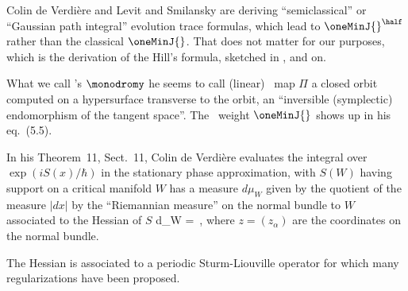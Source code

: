 \begin{description}
{Colin de Verdi{\`{e}}re} and Levit and
Smilansky are deriving ``semiclassical'' or ``Gaussian path
integral'' evolution trace formulas, which lead to $\oneMinJ{}^{\half}$
rather than the classical $\oneMinJ{}$. That does not matter for our
purposes, which is the derivation of the Hill's formula, sketched in
, and on.

What we call \po's {\monodromyM} $\monodromy$ he seems to call (linear)
\Poincare\ map $\Pi$ a closed orbit computed on a hypersurface transverse
to the orbit, an ``inversible (symplectic) endomorphism of the tangent
space''. The \po\ weight $\oneMinJ{}$ shows up in his eq.~(5.5).

In his Theorem~11, Sect.~11, Colin de Verdi{\`{e}}re evaluates the
integral over $\exp(iS(x)/\hbar)$ in the stationary phase approximation,
with $S(W)$ having support on a critical manifold $W$ has a measure
$d\mu_W$ given by the quotient of the measure $|dx|$ by the ``Riemannian
measure'' on the normal bundle to $W$ associated to the Hessian of $S$
\beq
d\mu_W = 
\,,
where $z=(z_\alpha)$ are the coordinates on the normal bundle.

The Hessian is associated to a periodic Sturm-Liouville operator for
which many regularizations have  been proposed.


\end{description}
